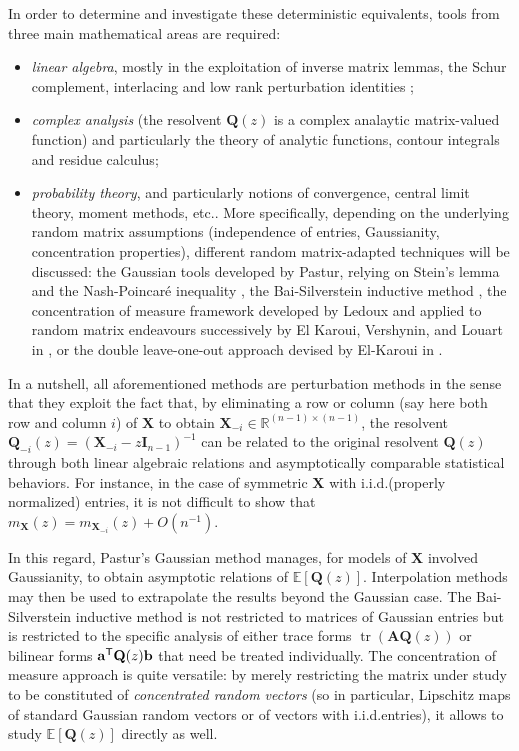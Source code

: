 \documentclass[MAL,biber]{nowfnt} %
\newcommand{\T}{{\sf T}}
\DeclareMathOperator{\tr}{tr}
\newcommand{\A}{{\mathbf{A}}}
\newcommand{\I}{{\mathbf{I}}}
\newcommand{\Q}{{\mathbf{Q}}}
\newcommand{\X}{{\mathbf{X}}}
\renewcommand{\a}{{\mathbf{a}}}
\renewcommand{\b}{{\mathbf{b}}}
\newcommand{\EE}{{\mathbb{E}}}
\begin{document}
In order to determine and investigate these deterministic equivalents, tools from three main mathematical areas are required:
\begin{itemize}
    \item \emph{linear algebra}, mostly in the exploitation of inverse matrix lemmas, the Schur complement, interlacing and low rank perturbation identities \citep{horn2012matrix};
    \item \emph{complex analysis} (the resolvent $\Q(z)$ is a complex analaytic matrix-valued function) and particularly the theory of analytic functions, contour integrals and residue calculus;
    \item \emph{probability theory}, and particularly notions of convergence, central limit theory, moment methods, etc.\@ \citep{billingsley2012probability}. More specifically, depending on the underlying random matrix assumptions (independence of entries, Gaussianity, concentration properties), different random matrix-adapted techniques will be discussed: the Gaussian tools developed by Pastur, relying on Stein's lemma and the Nash-Poincaré inequality \citep{pastur2011eigenvalue}, the Bai-Silverstein inductive method \citep{bai2010spectral}, the concentration of measure framework developed by Ledoux \citep{ledoux2001concentration} and applied to random matrix endeavours successively by El Karoui, Vershynin, and Louart in \citep{el2009concentration,vershynin2010introduction,louart2019concentration}, or the double leave-one-out approach devised by El-Karoui in \citep{el2013robust}.
\end{itemize}
In a nutshell, all aforementioned methods are perturbation methods in the sense that they exploit the fact that, by eliminating a row or column (say here both row and column $i$) of $\X$ to obtain $\X_{-i}\in\mathbb{R}^{(n-1)\times (n-1)}$, the resolvent $\Q_{-i}(z)=(\X_{-i}-z\I_{n-1})^{-1}$ can be related to the original resolvent $\Q(z)$ through both linear algebraic relations and asymptotically comparable statistical behaviors. For instance, in the case of symmetric $\X$ with i.i.d.\@ (properly normalized) entries, it is not difficult to show that $m_\X(z)=m_{\X_{-i}}(z)+O(n^{-1})$.

In this regard, Pastur's Gaussian method manages, for models of $\X$ involved Gaussianity, to obtain asymptotic relations of $\EE[\Q(z)]$. Interpolation methods may then be used to extrapolate the results beyond the Gaussian case. The Bai-Silverstein inductive method is not restricted to matrices of Gaussian entries but is restricted to the specific analysis of either trace forms $\tr (\A\Q(z))$ or bilinear forms $\a^\T\Q(z)\b$ that need be treated individually. The concentration of measure approach is quite versatile: by merely restricting the matrix under study to be constituted of \emph{concentrated random vectors} (so in particular, Lipschitz maps of standard Gaussian random vectors or of vectors with i.i.d.\@ entries), it allows to study $\EE[\Q(z)]$ directly as well.
\end{document}
